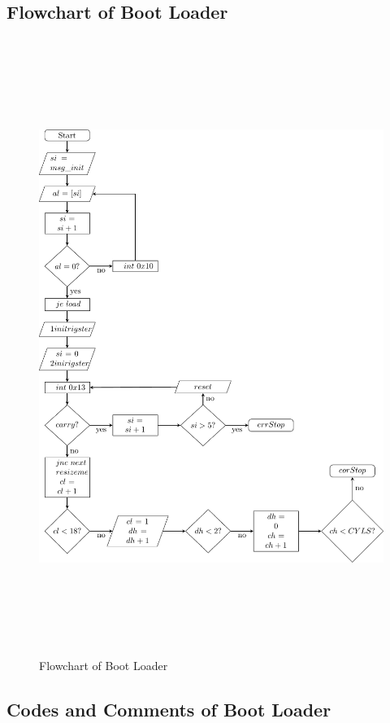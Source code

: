 \documentclass{swfcthesisp}
\begin{document}
\subsection{Flowchart of Boot Loader}
\label{sec:flowch-boot-load}
\begin{figure}[!ht]
  \centering
  \includegraphics[width=16cm, height=20cm]{../FlowchartTex/1/flowchartp.pdf}
  \caption{Flowchart of Boot Loader}
  \label{fig:flowchart-of-boot-loader}
\end{figure}




\subsection{Codes and Comments of Boot Loader}
\label{sec:codes-comments}
\end{document}
